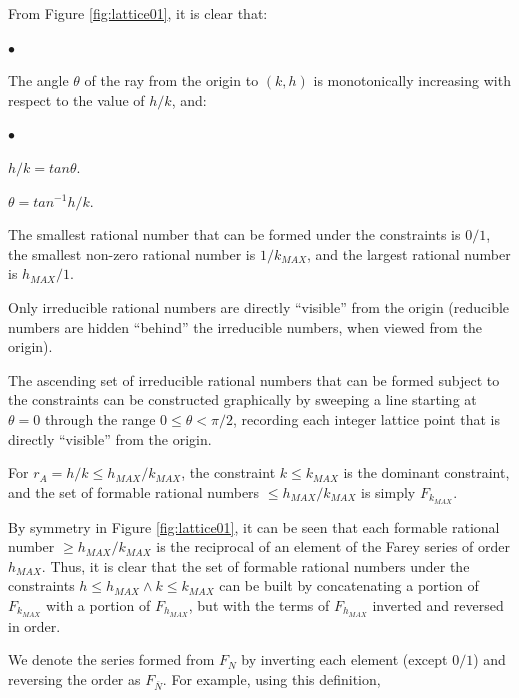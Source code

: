 \documentclass{esub2acm}
\newenvironment{generalenum}{\begin{list}
               {$\bullet$}{\setlength{\labelwidth}{3mm}\setlength{\leftmargin}{6mm}}}
               {\end{list}}
\newenvironment{generalenumindent01}{\begin{list}
               {$\bullet$}{\setlength{\labelwidth}{3mm}\setlength{\leftmargin}{12mm}}}
               {\end{list}}
\begin{document}
From Figure \ref{fig:lattice01}, it is clear that:

\begin{generalenum}
\item  The angle $\theta$ of the ray from the origin to $(k,h)$
       is monotonically increasing with respect to the value of
       $h/k$, and:

       \begin{generalenumindent01}
       \item $h/k = tan \theta$.
       \item $\theta = tan^{-1} h/k$.
       \end{generalenumindent01}

\item  The smallest rational number that can be formed under the
       constraints is $0/1$, the smallest non-zero rational number
       is $1/k_{MAX}$, and the largest rational number is $h_{MAX}/1$.

\item  Only irreducible rational numbers are directly ``visible''
       from the origin (reducible numbers are hidden ``behind''
       the irreducible numbers, when viewed from the origin).

\item  The ascending set of irreducible rational numbers that can be formed
       subject to the constraints can be constructed graphically
       by sweeping a line starting at $\theta = 0$ through the range
       $0 \leq \theta < \pi/2$, recording each integer lattice point
       that is directly ``visible'' from the origin.

\item  For $r_A = h/k \leq h_{MAX}/k_{MAX}$, the constraint $k \leq k_{MAX}$ is the
       dominant constraint, and the set of formable rational numbers
       $\leq h_{MAX}/k_{MAX}$ is simply $F_{k_{MAX}}$.

\end{generalenum}

By symmetry in Figure \ref{fig:lattice01}, it can be
seen that each formable rational number $\geq h_{MAX}/k_{MAX}$ is the reciprocal
of an element of the Farey series of order $h_{MAX}$.  Thus, it is clear that
the set of formable rational numbers under the constraints
$h \leq h_{MAX} \wedge k \leq k_{MAX}$ can be built by concatenating
a portion of $F_{k_{MAX}}$ with a portion of $F_{h_{MAX}}$, but with
the terms of $F_{h_{MAX}}$ inverted and reversed in order.

We denote the series formed from $F_N$ by inverting each element (except $0/1$)
and reversing the order as $F_{\overline{N}}$.  For example, using this definition,
\end{document}
